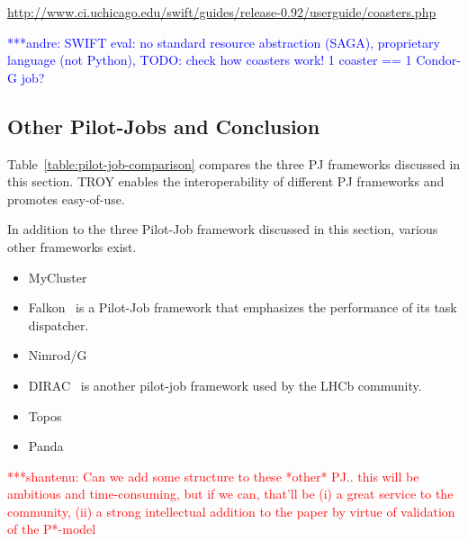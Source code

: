 \documentclass[conference,final]{IEEEtran}
\newcommand{\jhanote}[1]{ {\textcolor{red} { ***shantenu: #1 }}}
\newcommand{\alnote}[1]{ {\textcolor{blue} { ***andre: #1 }}}
\newcommand{\alnote}[1]{}
\newcommand{\jhanote}[1]{}
\begin{document}
\url{http://www.ci.uchicago.edu/swift/guides/release-0.92/userguide/coasters.php}


\alnote{SWIFT eval: no standard resource abstraction (SAGA), proprietary 
language (not Python), TODO: check how coasters work! 1 coaster == 1 Condor-G 
job?}


\subsection{Other Pilot-Jobs and Conclusion}

Table~\ref{table:pilot-job-comparison} compares the three PJ frameworks
discussed in this section. TROY enables the interoperability of different PJ
frameworks and promotes easy-of-use.


In addition to the three Pilot-Job framework discussed in this section, various
other frameworks exist.
\begin{itemize}
    \item MyCluster
    \item Falkon~\cite{1362680} is a Pilot-Job framework that emphasizes the 
	performance of its task dispatcher.
    \item Nimrod/G
    \item DIRAC~\cite{1742-6596-219-6-062049} is another pilot-job framework 
	used by the LHCb community.
    \item Topos
    \item Panda    
\end{itemize}


\jhanote{Can we add some structure to these *other* PJ.. this will be
  ambitious and time-consuming, but if we can, that'll be (i) a great
  service to the community, (ii) a strong intellectual addition to the
  paper by virtue of validation of the P*-model}
\end{document}
